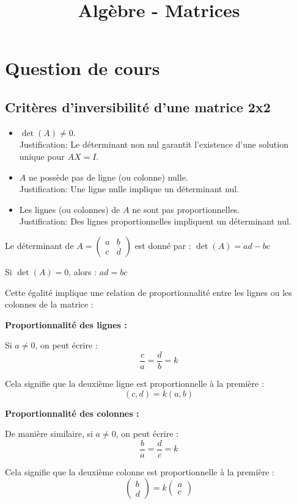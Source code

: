 \documentclass[10pt,a4paper]{article}
\title{Algèbre - Matrices}
\author{}
\date{}
\begin{document}
\maketitle

\section*{Question de cours}

\subsection*{Critères d'inversibilité d'une matrice 2x2}

\begin{itemize}
    \item $\det(A) \neq 0$. \\
    Justification: Le déterminant non nul garantit l'existence d'une solution unique pour $AX = I$.
    \item $A$ ne possède pas de ligne (ou colonne) nulle.\\
    Justification: Une ligne nulle implique un déterminant nul.
    \item Les lignes (ou colonnes) de $A$ ne sont pas proportionnelles.\\
    Justification: Des lignes proportionnelles impliquent un déterminant nul.
\end{itemize}

Le déterminant de $A = \begin{pmatrix} a & b \\ c & d \end{pmatrix}$ est donné par :
$ \det(A) = ad - bc $

Si $\det(A) = 0$, alors : $ ad = bc $

Cette égalité implique une relation de proportionnalité entre les lignes ou les colonnes de la matrice :

\textbf{Proportionnalité des lignes :}

Si $a \neq 0$, on peut écrire :
$$ \frac{c}{a} = \frac{d}{b} = k $$

Cela signifie que la deuxième ligne est proportionnelle à la première :
$$ (c,d) = k(a,b) $$

\textbf{Proportionnalité des colonnes :}

De manière similaire, si $a \neq 0$, on peut écrire :
$$ \frac{b}{a} = \frac{d}{c} = k $$

Cela signifie que la deuxième colonne est proportionnelle à la première :
$$ \begin{pmatrix} b \\ d \end{pmatrix} = k\begin{pmatrix} a \\ c \end{pmatrix} $$
\end{document}
